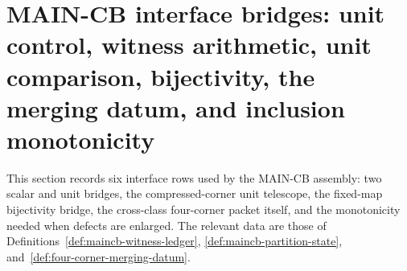\section{MAIN-CB interface bridges: unit control, witness arithmetic, unit comparison, bijectivity, the merging datum, and inclusion monotonicity}\label{sec:maincb-bridges}

This section records six interface rows used by the MAIN-CB assembly: two scalar and unit
bridges, the compressed-corner unit telescope, the fixed-map bijectivity bridge, the
cross-class four-corner packet itself, and the monotonicity needed when defects are enlarged.
The relevant data are those of Definitions~\ref{def:maincb-witness-ledger},
\ref{def:maincb-partition-state}, and~\ref{def:four-corner-merging-datum}.

